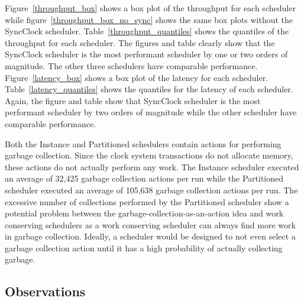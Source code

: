 \clearpage

Figure~\ref{throughput_box} shows a box plot of the throughput for each scheduler while figure~\ref{throughput_box_no_sync} shows the same box plots without the SyncClock scheduler.
Table~\ref{throughput_quantiles} shows the quantiles of the throughput for each scheduler.
The figures and table clearly show that the SyncClock scheduler is the most performant scheduler by one or two orders of magnitude.
The other three schedulers have comparable performance.
Figure~\ref{latency_box} shows a box plot of the latency for each scheduler.
Table~\ref{latency_quantiles} shows the quantiles for the latency of each scheduler.
Again, the figure and table show that SyncClock scheduler is the most performant scheduler by two orders of magnitude while the other scheduler have comparable performance.

Both the Instance and Partitioned schedulers contain actions for performing garbage collection.
Since the clock system transactions do not allocate memory, these actions do not actually perform any work.
The Instance scheduler executed an average of 32,425 garbage collection actions per run while the Partitioned scheduler executed an average of 105,638 garbage collection actions per run.
The excessive number of collections performed by the Partitioned scheduler show a potential problem between the garbage-collection-as-an-action idea and work conserving schedulers as a work conserving scheduler can always find more work in garbage collection.
Ideally, a scheduler would be designed to not even select a garbage collection action until it has a high probability of actually collecting garbage.

\subsection{Observations}

